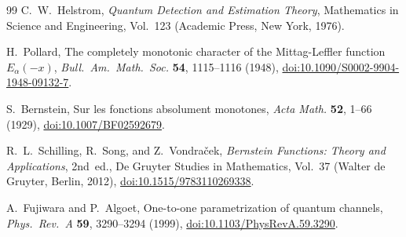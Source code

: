 \documentclass[twocolumn,10pt,amsmath,amssymb,floatfix]{revtex4-2}
\theoremstyle{plain}
\theoremstyle{definition}
\begin{document}
{\begin{thebibliography}{99}
C.~W.~Helstrom,
\emph{Quantum Detection and Estimation Theory},
Mathematics in Science and Engineering, Vol.~123 (Academic Press, New York, 1976).

H.~Pollard,
The completely monotonic character of the Mittag-Leffler function $E_\alpha(-x)$,
\emph{Bull.\ Am.\ Math.\ Soc.} \textbf{54}, 1115--1116 (1948),
\href{https://doi.org/10.1090/S0002-9904-1948-09132-7}{doi:10.1090/S0002-9904-1948-09132-7}.

S.~Bernstein,
Sur les fonctions absolument monotones,
\emph{Acta Math.} \textbf{52}, 1--66 (1929),
\href{https://doi.org/10.1007/BF02592679}{doi:10.1007/BF02592679}.

R.~L.~Schilling, R.~Song, and Z.~Vondra\v{c}ek,
\emph{Bernstein Functions: Theory and Applications}, 2nd~ed.,
De Gruyter Studies in Mathematics, Vol.~37 (Walter de Gruyter, Berlin, 2012),
\href{https://doi.org/10.1515/9783110269338}{doi:10.1515/9783110269338}.

A.~Fujiwara and P.~Algoet,
One-to-one parametrization of quantum channels,
\emph{Phys.\ Rev.\ A} \textbf{59}, 3290--3294 (1999),
\href{https://doi.org/10.1103/PhysRevA.59.3290}{doi:10.1103/PhysRevA.59.3290}.

\end{thebibliography}
}
\end{document}
